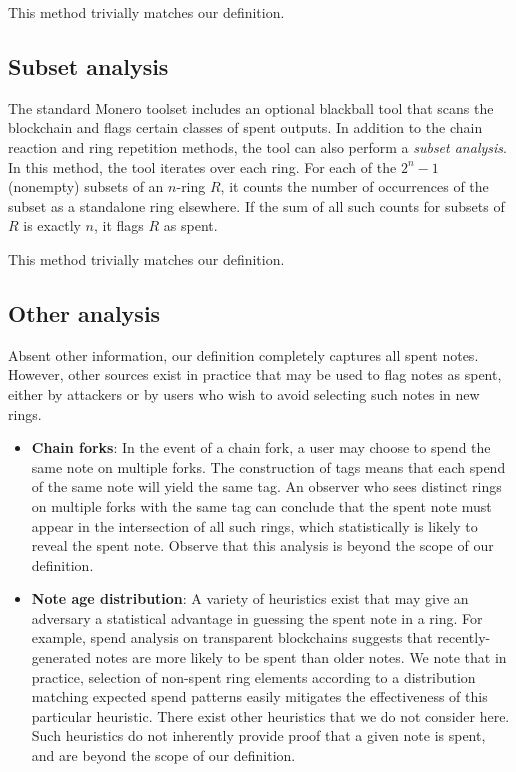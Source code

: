 \documentclass{mrl}
\begin{document}
This method trivially matches our definition.

\subsection{Subset analysis}
The standard Monero toolset includes an optional blackball tool that scans the blockchain and flags certain classes of spent outputs. In addition to the chain reaction and ring repetition methods, the tool can also perform a \textit{subset analysis}. In this method, the tool iterates over each ring. For each of the $2^n-1$ (nonempty) subsets of an $n$-ring $R$, it counts the number of occurrences of the subset as a standalone ring elsewhere. If the sum of all such counts for subsets of $R$ is exactly $n$, it flags $R$ as spent.

This method trivially matches our definition.

\subsection{Other analysis}
Absent other information, our definition completely captures all spent notes. However, other sources exist in practice that may be used to flag notes as spent, either by attackers or by users who wish to avoid selecting such notes in new rings.

\begin{itemize}
\item \textbf{Chain forks}: In the event of a chain fork, a user may choose to spend the same note on multiple forks. The construction of tags means that each spend of the same note will yield the same tag. An observer who sees distinct rings on multiple forks with the same tag can conclude that the spent note must appear in the intersection of all such rings, which statistically is likely to reveal the spent note. Observe that this analysis is beyond the scope of our definition.
\item \textbf{Note age distribution}: A variety of heuristics exist that may give an adversary a statistical advantage in guessing the spent note in a ring. For example, spend analysis on transparent blockchains suggests that recently-generated notes are more likely to be spent than older notes. We note that in practice, selection of non-spent ring elements according to a distribution matching expected spend patterns easily mitigates the effectiveness of this particular heuristic. There exist other heuristics that we do not consider here. Such heuristics do not inherently provide proof that a given note is spent, and are beyond the scope of our definition. 
\end{itemize}
\end{document}
